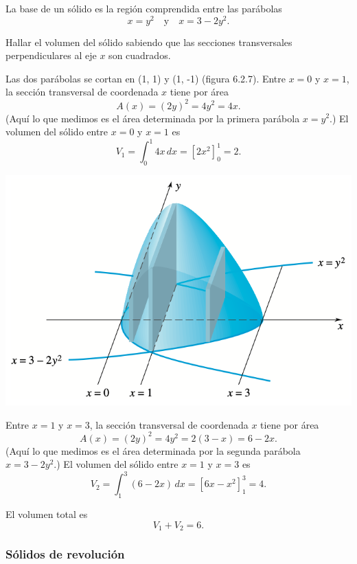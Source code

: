 \begin{example}
  La base de un sólido es la región comprendida entre las parábolas
  \[
  x = y^2 \quad \text{y} \quad x = 3 - 2y^2.
  \]
  
  Hallar el volumen del sólido sabiendo que las secciones transversales perpendiculares al eje $x$ son cuadrados.
    
  
  \noindent\begin{minipage}{.6\textwidth}
    Las dos parábolas se cortan en (1, 1) y (1, -1) (figura 6.2.7). Entre $x = 0$ y $x = 1$, la sección transversal de coordenada $x$ tiene por área
    \[
    A(x) = (2y)^2 = 4y^2 = 4x.
    \]
    (Aquí lo que medimos es el área determinada por la primera parábola $x = y^2$.) El volumen del sólido entre $x = 0$ y $x = 1$ es
\[
V_1 = \int_0^1 4x \, dx = \left[ 2x^2 \right]_0^1 = 2.
\]

  \end{minipage}
  \begin{minipage}{.39\textwidth}
    \begin{center}
      \includegraphics[width=.9\textwidth]{pics/volumen-3.png}
    \end{center}
  \end{minipage}

Entre $x = 1$ y $x = 3$, la sección transversal de coordenada $x$ tiene por área
\[
A(x) = (2y)^2 = 4y^2 = 2(3-x) = 6 - 2x.
\]
(Aquí lo que medimos es el área determinada por la segunda parábola $x = 3 - 2y^2$.) 
El volumen del sólido entre $x = 1$ y $x = 3$ es
\[
V_2 = \int_1^3 (6-2x) \, dx = \left[ 6x - x^2 \right]_1^3 = 4.
\]

El volumen total es
\[
V_1 + V_2 = 6.
\]
\end{example}
  
\subsubsection*{Sólidos de revolución}


